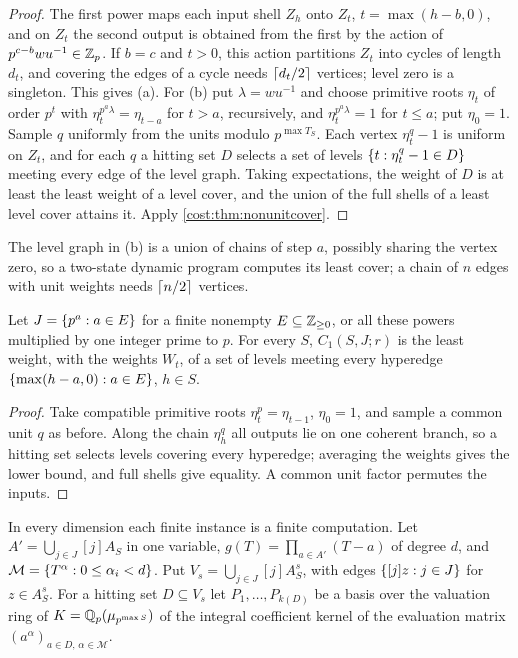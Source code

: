 \begin{proof}
The first power maps each input shell $Z_h$ onto $Z_t$, $t=\max(h-b,0)$, and on $Z_t$ the
second output is obtained from the first by the action of $p^{c-b}wu^{-1}\in\mathbb{Z}_p$. If
$b=c$ and $t>0$, this action partitions $Z_t$ into cycles of length $d_t$, and covering the
edges of a cycle needs $\lceil d_t/2\rceil$ vertices; level zero is a singleton. This gives (a).
For (b) put $\lambda=wu^{-1}$ and choose primitive roots $\eta_t$ of order $p^t$ with
$\eta_t^{p^a\lambda}=\eta_{t-a}$ for $t>a$, recursively, and $\eta_t^{p^a\lambda}=1$ for
$t\le a$; put $\eta_0=1$. Sample $q$ uniformly from the units modulo $p^{\max T_S}$. Each
vertex $\eta_t^q-1$ is uniform on $Z_t$, and for each $q$ a hitting set $D$ selects a set of
levels $\{t:\eta_t^q-1\in D\}$ meeting every edge of the level graph. Taking expectations,
the weight of $D$ is at least the least weight of a level cover, and the union of the full
shells of a least level cover attains it. Apply \cref{cost:thm:nonunitcover}.
\end{proof}

The level graph in (b) is a union of chains of step $a$, possibly sharing the vertex zero,
so a two-state dynamic program computes its least cover; a chain of $n$ edges with unit
weights needs $\lceil n/2\rceil$ vertices.

\begin{theorem}\label{cost:thm:levels}
Let $J=\{p^a:a\in E\}$ for a finite nonempty $E\subseteq\mathbb{Z}_{\ge0}$, or all these powers
multiplied by one integer prime to $p$. For every $S$, $C_1(S,J;r)$ is the least weight,
with the weights $W_t$, of a set of levels meeting every hyperedge
$\{\max(h-a,0):a\in E\}$, $h\in S$.
\end{theorem}

\begin{proof}
Take compatible primitive roots $\eta_t^p=\eta_{t-1}$, $\eta_0=1$, and sample a common unit
$q$ as before. Along the chain $\eta_h^q$ all outputs lie on one coherent branch, so a
hitting set selects levels covering every hyperedge; averaging the weights gives the lower
bound, and full shells give equality. A common unit factor permutes the inputs.
\end{proof}

In every dimension each finite instance is a finite computation. Let
$A'=\bigcup_{j\in J}[j]A_S$ in one variable, $g(T)=\prod_{a\in A'}(T-a)$ of degree $d$, and
$\mathcal M=\{T^\alpha:0\le\alpha_i<d\}$. Put $V_s=\bigcup_{j\in J}[j]A_S^s$, with edges
$\{[j]z:j\in J\}$ for $z\in A_S^s$. For a hitting set $D\subseteq V_s$ let
$P_1,\dots,P_{k(D)}$ be a basis over the valuation ring of $K=\mathbb{Q}_p(\mu_{p^{\max S}})$ of the
integral coefficient kernel of the evaluation matrix $(a^\alpha)_{a\in D,\,\alpha\in\mathcal M}$.

